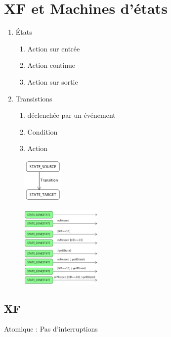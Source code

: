 \documentclass[resume]{subfiles}
\begin{document}
\section{XF et Machines d'états}
\begin{enumerate}
\item États
\begin{enumerate}
\item Action sur entrée
\item Action continue
\item Action sur sortie
\end{enumerate}
\item Transistions
\begin{enumerate}
\item déclenchée par un événement
\item Condition
\item Action
\end{enumerate}
\end{enumerate}
\begin{figure}[H]
\centering
\includegraphics[width=2.00cm]{img_8.png}
\end{figure}
\begin{figure}[H]
\centering
\includegraphics[width=4.00cm]{img_9.png}
\end{figure}
\subsection{XF}
Atomique : Pas d'interruptions
\end{document}
